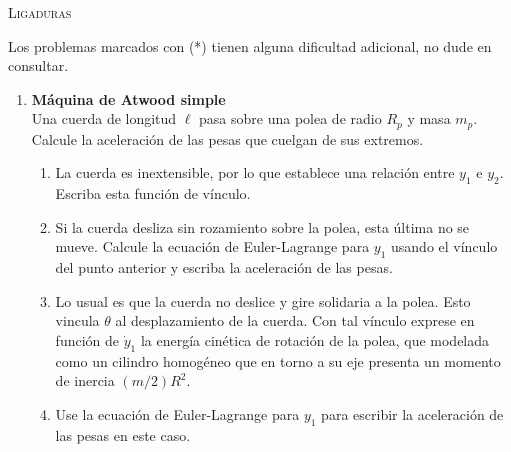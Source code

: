 \documentclass[11pt, spanish, a4paper, twoside]{article}
\begin{document}
\begin{center}
  \textsc{\large Ligaduras}
\end{center}

\noindent
Los problemas marcados con (*) tienen alguna dificultad adicional, no dude en consultar.

\begin{enumerate}

\item 
	\begin{minipage}[t][3cm]{0.72\textwidth}
		\textbf{Máquina de Atwood simple}\\
		Una cuerda de longitud \(\ell\) pasa sobre una polea de radio \(R_p\) y masa \(m_p\).
		Calcule la aceleración de las pesas que cuelgan de sus extremos.
	\end{minipage}
	\begin{minipage}[c][3cm][t]{0.2\textwidth}
		
	\end{minipage}
		\begin{enumerate}
			\item La cuerda es inextensible, por lo que establece una relación entre \(y_1\) e \(y_2\).
			Escriba esta función de vínculo.
			\item Si la cuerda desliza sin rozamiento sobre la polea, esta última no se mueve.
			Calcule la ecuación de Euler-Lagrange para \(y_1\) usando el vínculo del punto anterior y escriba la aceleración de las pesas.
			\item Lo usual es que la cuerda no deslice y gire solidaria a la polea.
			Esto vincula \(\theta\) al desplazamiento de la cuerda.
			Con tal vínculo exprese en función de \(\dot{y}_1\) la energía cinética de rotación de la polea, que modelada como un cilindro homogéneo que en torno a su eje presenta un momento de inercia \((m/2) R^2\).
			\item Use la ecuación de Euler-Lagrange para \(y_1\) para escribir la aceleración de las pesas en este caso.
		\end{enumerate}


\end{enumerate}
\end{document}
